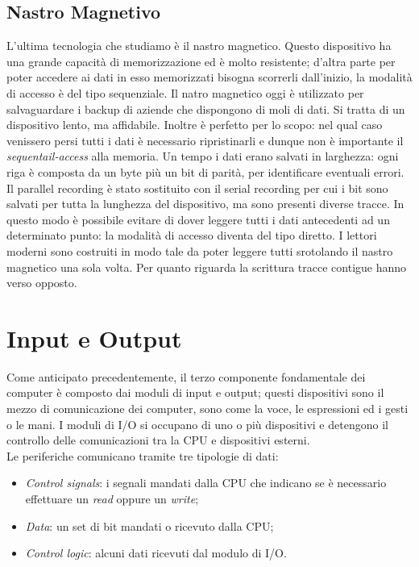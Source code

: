 \documentclass{article}
\begin{document}
\subsection{Nastro Magnetivo}

L'ultima tecnologia che studiamo è il nastro magnetico. Questo dispositivo ha una  grande capacità di memorizzazione ed è molto resistente; d'altra parte per poter accedere ai dati in esso memorizzati bisogna scorrerli dall'inizio, la modalità di accesso è del tipo sequenziale. Il natro magnetico oggi è utilizzato per salvaguardare i backup di aziende che dispongono di moli di dati. Si tratta di un dispositivo lento, ma affidabile. Inoltre è perfetto per lo scopo: nel qual caso venissero persi tutti i dati è necessario ripristinarli e dunque non è importante il \textit{sequentail-access} alla memoria.
\indent Un tempo i dati erano salvati in larghezza: ogni riga è composta da un byte più un bit di parità, per identificare eventuali errori. Il parallel recording è stato sostituito con il serial recording per cui i bit sono salvati per tutta la lunghezza del dispositivo, ma sono presenti diverse tracce. In questo modo è possibile evitare di dover leggere tutti i dati antecedenti ad un determinato punto: la modalità di accesso diventa del tipo diretto. I lettori moderni sono costruiti in modo tale da poter leggere tutti srotolando il nastro magnetico una sola volta. Per quanto riguarda la scrittura tracce contigue hanno verso opposto.

\section{Input e Output}
\label{i/o}

Come anticipato precedentemente, il terzo componente fondamentale dei computer è composto dai moduli di input e output; questi dispositivi sono il mezzo di comunicazione dei computer, sono come la voce, le espressioni ed i gesti o le mani. I moduli di I/O si occupano di uno o più dispositivi e detengono il controllo delle comunicazioni tra la CPU e dispositivi esterni. \\

Le periferiche comunicano tramite tre tipologie di dati:
\begin{itemize}
	\item \textit{Control signals}: i segnali mandati dalla CPU che indicano se è necessario effettuare un \textit{read} oppure un \textit{write};

	\item \textit{Data}: un set di bit mandati o ricevuto dalla CPU;

	\item \textit{Control logic}: alcuni dati ricevuti dal modulo di I/O.
\end{itemize}
\end{document}
